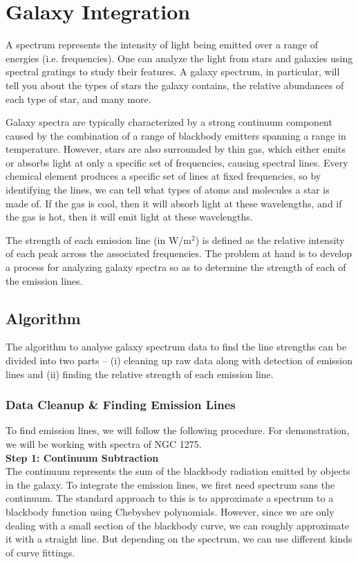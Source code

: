 \newpage
\section{Galaxy Integration}
A spectrum represents the intensity of light being emitted over a range of energies (i.e. frequencies). One can analyze the light from stars and galaxies using spectral gratings to study their features. A galaxy spectrum, in particular, will tell you about the types of stars the galaxy contains, the relative abundances of each type of star, and many more.

Galaxy spectra are typically characterized by a strong continuum component caused by the combination of a range of blackbody emitters spanning a range in temperature. 
However, stars are also surrounded by
thin gas, which either emits or absorbs light at only a specific set of frequencies,
causing spectral lines. Every chemical element produces a specific set of lines at fixed frequencies, so by identifying the lines, we can tell what types of atoms and molecules a star is made of. If the gas is cool, then it will absorb light at these wavelengths, and if the gas is hot, then it will emit light at these
wavelengths. 

The strength of each emission line (in W/m$^2$) is defined as the relative intensity
of each peak across the associated frequencies.
The problem at hand is to develop a process for analyzing galaxy spectra so as
to determine the strength of each of the emission lines.

\subsection{Algorithm}
The algorithm to analyse galaxy spectrum data to find the line strengths can be divided into two parts -- (i) cleaning up raw data along with detection of emission lines and (ii) finding the relative strength of each emission line. 

\subsubsection{Data Cleanup \& Finding Emission Lines}
To find emission lines, we will follow the following procedure. For demonstration, we will be working with spectra of NGC 1275.\\

\noindent \textbf{Step 1: Continuum Subtraction}\\
\noindent The continuum represents the sum of the blackbody radiation emitted by objects in the galaxy. To integrate the emission lines, we first need spectrum sans the continuum. The standard approach to this is to approximate a spectrum to a blackbody function using Chebyshev polynomials. However, since we are only dealing with a small section of the blackbody curve, we can roughly approximate it with a straight line. But depending on the spectrum, we can use different kinds of curve fittings.

